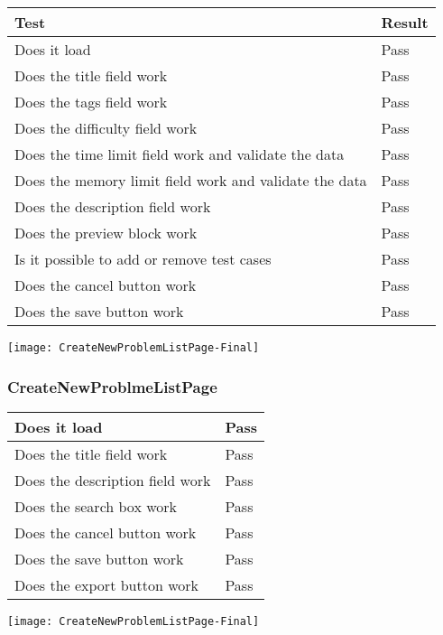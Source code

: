 \documentclass[report.tex]{subfiles}
\begin{document}
\begin{tabulary}{\linewidth}{|L|l|}
    \hline
    Test & Result \\
    \hline
    Does it load & Pass \\
    \hline
    Does the title field work & Pass \\
    \hline
    Does the tags field work & Pass \\
    \hline
    Does the difficulty field work & Pass \\
    \hline
    Does the time limit field work and validate the data & Pass \\
    \hline
    Does the memory limit field work and validate the data & Pass \\
    \hline
    Does the description field work & Pass \\
    \hline
    Does the preview block work & Pass \\
    \hline
    Is it possible to add or remove test cases & Pass \\
    \hline
    Does the cancel button work & Pass \\
    \hline
    Does the save button work & Pass \\
    \hline
\end{tabulary}

\texttt{[image: CreateNewProblemListPage-Final]}

\subsubsection{CreateNewProblmeListPage}

\begin{tabulary}{\linewidth}{|L|l|}
    \hline
    Does it load & Pass \\
    \hline
    Does the title field work & Pass \\
    \hline
    Does the description field work & Pass \\
    \hline
    Does the search box work & Pass \\
    \hline
    Does the cancel button work & Pass \\
    \hline
    Does the save button work & Pass \\
    \hline
    Does the export button work & Pass \\
    \hline
\end{tabulary}

\texttt{[image: CreateNewProblemListPage-Final]}
\end{document}
